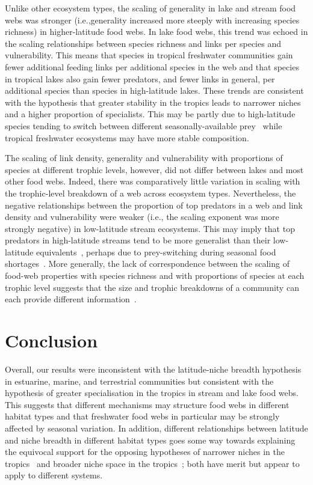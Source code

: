 \documentclass[12pt]{article}
\begin{document}
  Unlike other ecosystem types, the scaling of generality in lake and stream
  food webs was stronger (i.e.,generality increased more steeply with
  increasing species richness) in higher-latitude food webs. In lake food webs,
  this trend was echoed in the scaling relationships between species richness
  and links per species and vulnerability. This means that species in tropical
  freshwater communities gain fewer additional feeding links per additional
  species in the web and that species in tropical lakes also gain fewer
  predators, and fewer links in general, per additional species than species
  in high-latitude lakes. These trends are consistent with the hypothesis that
  greater stability in the tropics leads to narrower niches~\citep{Vazquez2004}
  and a higher proportion of specialists. This may be partly due to high-latitude 
  species tending to switch between different seasonally-available 
  prey~\citep{Magalhaes1993,Wilhelm1999,Isaac2012} while tropical
  freshwater ecosystems may have more stable composition. 


  The scaling of link density, generality and vulnerability with proportions
  of species at different trophic levels, however, did not differ between
  lakes and most other food webs. Indeed, there was comparatively little
  variation in scaling with the trophic-level breakdown of a web across
  ecosystem types. Nevertheless, the negative relationships between the
  proportion of top predators in a web and link density and vulnerability were
  weaker (i.e., the scaling exponent was more strongly negative) in low-latitude 
  stream ecosystems. This may imply that top predators in high-latitude 
  streams tend to be more generalist than their low-latitude
  equivalents~\citep{Winemiller2008}, perhaps due to prey-switching during
  seasonal food shortages~\citep{Magalhaes1993}. More generally, the lack of
  correspondence between the scaling of food-web properties with species
  richness and with proportions of species at each trophic level suggests that
  the size and trophic breakdowns of a community can each provide different
  information~\citep{Downing2002}.

\section*{Conclusion}

  Overall, our results were inconsistent with the latitude-niche breadth
  hypothesis in estuarine, marine, and terrestrial communities but consistent
  with the hypothesis of greater specialisation in the tropics in stream and
  lake food webs. This suggests that different mechanisms may structure food
  webs in different habitat types and that freshwater food webs in particular
  may be strongly affected by seasonal variation. In addition, different
  relationships between latitude and niche breadth in different habitat types
  goes some way towards explaining the equivocal support for the opposing
  hypotheses of narrower niches in the tropics~\citep{Vazquez2004} and broader
  niche space in the tropics~\citep{Davies2007}; both have merit but appear to
  apply to different systems.
\end{document}
